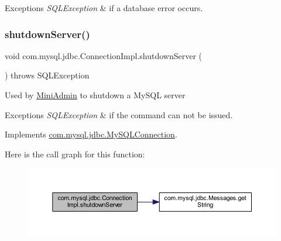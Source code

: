 \begin{DoxyExceptions}{Exceptions}
{\em S\+Q\+L\+Exception} & if a database error occurs. \\
\hline
\end{DoxyExceptions}
\mbox{\label{classcom_1_1mysql_1_1jdbc_1_1_connection_impl_a3c07294052ff8c623efdb0478dff6cde}} 
\subsubsection{\texorpdfstring{shutdown\+Server()}{shutdownServer()}}
{\footnotesize\ttfamily void com.\+mysql.\+jdbc.\+Connection\+Impl.\+shutdown\+Server (\begin{DoxyParamCaption}{ }\end{DoxyParamCaption}) throws S\+Q\+L\+Exception}

Used by \mbox{\hyperlink{classcom_1_1mysql_1_1jdbc_1_1_mini_admin}{Mini\+Admin}} to shutdown a My\+S\+QL server


\begin{DoxyExceptions}{Exceptions}
{\em S\+Q\+L\+Exception} & if the command can not be issued. \\
\hline
\end{DoxyExceptions}


Implements \mbox{\hyperlink{interfacecom_1_1mysql_1_1jdbc_1_1_my_s_q_l_connection_ab6fa367972e51a54bc186f7856568098}{com.\+mysql.\+jdbc.\+My\+S\+Q\+L\+Connection}}.

Here is the call graph for this function\+:\nopagebreak
\begin{figure}[H]
\begin{center}
\leavevmode
\includegraphics[width=350pt]{classcom_1_1mysql_1_1jdbc_1_1_connection_impl_a3c07294052ff8c623efdb0478dff6cde_cgraph}
\end{center}
\end{figure}
\mbox{\label{classcom_1_1mysql_1_1jdbc_1_1_connection_impl_a37c633847df022332f4c4648d28a1048}} 
